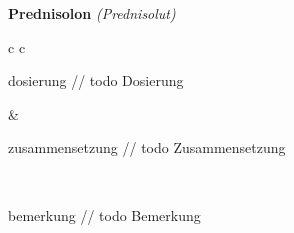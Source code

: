 \documentclass[12pt]{beamer}
\begin{document}
\begin{frame}{
    \textbf{Prednisolon}
    \textit{(Prednisolut)}
}
    \begin{tabular}{c c}
        \begin{beamercolorbox}[wd=\boxwidth\textwidth,ht=\boxheight\textheight,sep=1em]{dosierung}
        // todo Dosierung
        \end{beamercolorbox} & 
        \begin{beamercolorbox}[wd=\boxwidth\textwidth,ht=\boxheight\textheight,sep=1em]{zusammensetzung}
        // todo Zusammensetzung
        \end{beamercolorbox} \\
        \begin{beamercolorbox}[wd=\textwidth,ht=\boxheight\textheight,sep=1em]{bemerkung}
        // todo Bemerkung
        \end{beamercolorbox} \\
    \end{tabular}
\end{frame}
\end{document}
